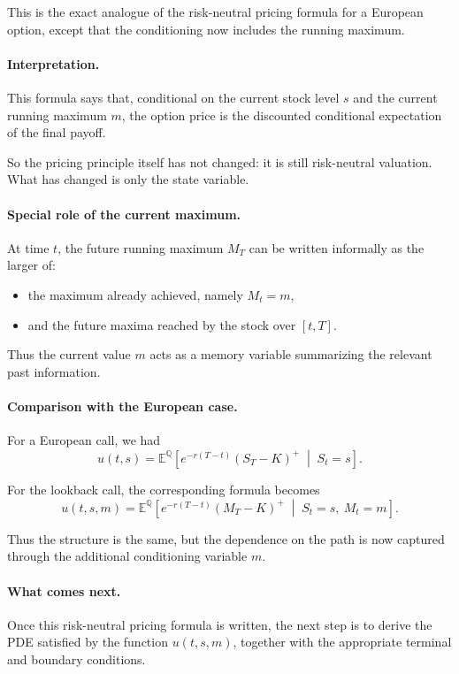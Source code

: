 \documentclass[11pt]{article}
\newcommand{\Qbb}{\mathbb{Q}}
\newcommand{\E}{\mathbb{E}}
\theoremstyle{plain}
\theoremstyle{definition}
\theoremstyle{remark}
\begin{document}
This is the exact analogue of the risk-neutral pricing formula for a
European option, except that the conditioning now includes the running
maximum.

\paragraph{Interpretation.}
This formula says that, conditional on the current stock level \(s\) and
the current running maximum \(m\), the option price is the discounted
conditional expectation of the final payoff.

So the pricing principle itself has not changed:
it is still risk-neutral valuation.
What has changed is only the state variable.

\paragraph{Special role of the current maximum.}
At time \(t\), the future running maximum \(M_T\) can be written
informally as the larger of:
\begin{itemize}[leftmargin=1.4em]
    \item the maximum already achieved, namely \(M_t=m\),
    \item and the future maxima reached by the stock over \([t,T]\).
\end{itemize}

Thus the current value \(m\) acts as a memory variable summarizing the
relevant past information.

\paragraph{Comparison with the European case.}
For a European call, we had
\[
u(t,s)
=
\E^\Qbb\!\left[
e^{-r(T-t)}(S_T-K)^+
\;\middle|\;
S_t=s
\right].
\]

For the lookback call, the corresponding formula becomes
\[
u(t,s,m)
=
\E^\Qbb\!\left[
e^{-r(T-t)}(M_T-K)^+
\;\middle|\;
S_t=s,\ M_t=m
\right].
\]

Thus the structure is the same, but the dependence on the path is now
captured through the additional conditioning variable \(m\).

\paragraph{What comes next.}
Once this risk-neutral pricing formula is written, the next step is to
derive the PDE satisfied by the function \(u(t,s,m)\), together with the
appropriate terminal and boundary conditions.
\end{document}
